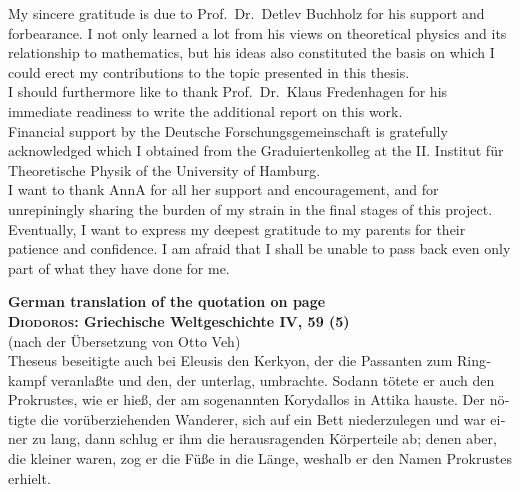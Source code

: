 \documentclass[11pt,twoside,openright]{report}
\theoremstyle{definition}
\theoremstyle{plain}
\theoremstyle{remark}
\theoremstyle{assumption}
\begin{document}
My sincere gratitude is due to Prof.~Dr.~Detlev Buchholz for his
support and forbearance. I not only learned a lot from his views on
theoretical physics and its relationship to mathematics, but his ideas
also constituted the basis on which I could erect my contributions to
the topic presented in this thesis. \\[1.5ex]
I should furthermore like to thank Prof.~Dr.~Klaus Fredenhagen for his
immediate readiness to write the additional report on this
work. \\[1.5ex]
Financial support by the Deutsche Forschungsgemeinschaft is gratefully
acknowledged which I obtained from the Graduiertenkolleg at the
II. Institut f\"{u}r Theoretische Physik of the University of
Hamburg. \\[2ex]
I want to thank AnnA for all her support and encouragement, and for
unrepiningly sharing the burden of my strain in the final stages of
this project. \\[1.5ex]
Eventually, I want to express my deepest gratitude to my parents for
their patience and confidence. I am afraid that I shall be unable to
pass back even only part of what they have done for me.


\clearpage


\lhead[\fancyplain{}{\bfseries\thepage}]{}
\rhead[]{\fancyplain{}{\bfseries\thepage}}

\vspace*{\fill}

\begin{otherlanguage}{german}
  \label{cit-prokrustes-transl}
  \noindent
  {\bfseries
   {\large German translation of the quotation on page
     \pageref{cit-prokrustes}} \\[0.5cm]
   {\Large\textsc {Diodoros}: Griechische Weltgeschichte IV, 59 (5)}
     \\[2mm] 
  }
  (nach der \"{U}bersetzung von Otto Veh) \\[1cm]
  Theseus beseitigte auch bei Eleusis den Kerkyon, der die Passanten
  zum Ringkampf veranla\ss{}te und den, der unterlag,
  umbrachte. Sodann t\"{o}tete er auch den Prokrustes, wie er
  hie\ss{}, der am sogenannten Korydallos in Attika hauste. Der
  n\"{o}tigte die vor\"{u}berziehenden Wanderer, sich auf ein Bett
  niederzulegen und war einer zu lang, dann schlug er ihm die
  herausragenden K\"{o}rperteile ab; denen aber, die kleiner waren,
  zog er die F\"{u}\ss{}e in die L\"{a}nge, weshalb er den Namen
  Prokrustes erhielt. 
\end{otherlanguage}

\vspace*{\fill}

\vspace*{\fill}
\end{document}

